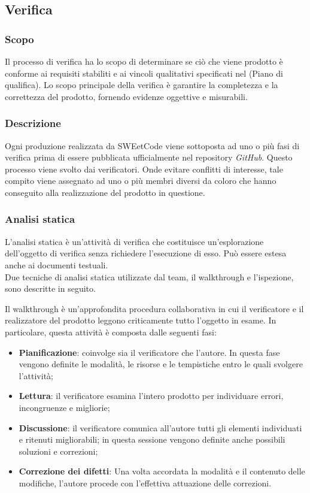 \documentclass[10pt, a4paper]{article}
\begin{document}
\subsection{Verifica}
\subsubsection{Scopo}
Il processo di verifica ha lo scopo di determinare se ciò che viene prodotto è conforme ai requisiti stabiliti e ai vincoli qualitativi specificati nel (Piano di qualifica).
Lo scopo principale della verifica è garantire la completezza e la correttezza del prodotto, fornendo evidenze oggettive e misurabili.

\subsubsection{Descrizione}
Ogni produzione realizzata da SWEetCode viene sottoposta ad uno o più fasi di verifica prima di essere pubblicata ufficialmente nel repository \textit{GitHub}.
Questo processo viene svolto dai verificatori. Onde evitare conflitti di interesse, tale compito viene assegnato ad uno o più membri diversi da coloro che hanno conseguito alla realizzazione del prodotto in questione.

\subsubsection{Analisi statica}
L'analisi statica è un'attività di verifica che costituisce un'esplorazione dell'oggetto di verifica senza richiedere l'esecuzione di esso. Può essere estesa anche ai documenti testuali.\\
Due tecniche di analisi statica utilizzate dal team, il walkthrough e l'ispezione, sono descritte in seguito.

 Il walkthrough è un'approfondita procedura collaborativa in cui il verificatore e il realizzatore del prodotto leggono criticamente tutto l'oggetto in esame. In particolare, questa attività è composta dalle seguenti fasi:
\begin{itemize}
    \item \textbf{Pianificazione}: coinvolge sia il verificatore che l'autore. In questa fase vengono definite le modalità, le risorse e le tempistiche entro le quali svolgere l'attività;
    \item \textbf{Lettura}: il verificatore esamina l'intero prodotto per individuare errori, incongruenze e migliorie;
    \item \textbf{Discussione}: il verificatore comunica all'autore tutti gli elementi individuati e ritenuti migliorabili; in questa sessione vengono definite anche possibili soluzioni e correzioni;
    \item \textbf{Correzione dei difetti}: Una volta accordata la modalità e il contenuto delle modifiche, l'autore procede con l'effettiva attuazione delle correzioni.
\end{itemize}
\end{document}
